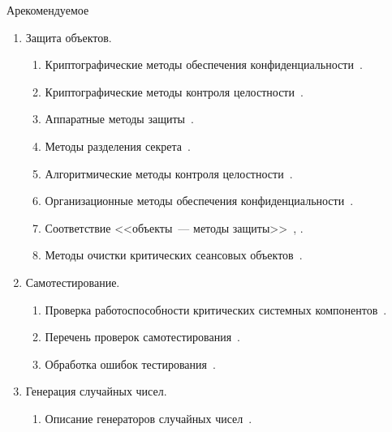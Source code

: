 \begin{appendix}{А}{рекомендуемое}
\begin{enumerate}
\begin{enumerate}
\item
Состояния системного сеанса и правила перехода между состояниями~.
\end{enumerate}

\item
{Защита объектов.}

\begin{enumerate}
\item
Криптографические методы обеспечения конфиденциальности~.

\item
Криптографические методы контроля целостности~.

\item
Аппаратные методы защиты~.

\item
Методы разделения секрета~.

\item
Алгоритмические методы контроля целостности~.

\item
Организационные методы обеспечения конфиденциальности~.

\item
Соответствие <<объекты~--- методы защиты>>~, .

\item
Методы очистки критических сеансовых объектов~.
\end{enumerate}

\item
{Самотестирование.}

\begin{enumerate}
\item
Проверка работоспособности критических системных компонентов~.

\item
Перечень проверок самотестирования~.

\item
Обработка ошибок тестирования~.
\end{enumerate}

\item
{Генерация случайных чисел.}

\begin{enumerate}
\item
Описание генераторов случайных чисел~.


\end{enumerate}
\end{enumerate}
\end{appendix}
